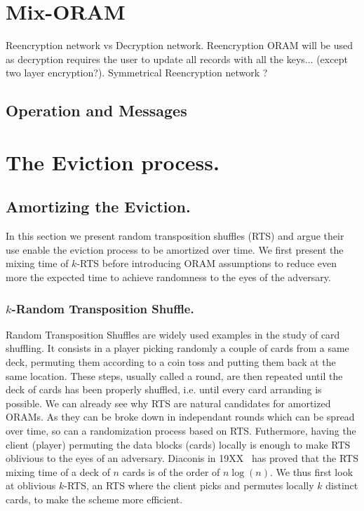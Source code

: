 \documentclass[a4paper]{article}
\begin{document}
\section{Mix-ORAM}
\label{section2}
Reencryption network vs Decryption network. Reencryption ORAM will be used as decryption requires the user to update all records with all the keys... (except two layer encryption?).
Symmetrical Reencryption network ?

\subsection{Operation and Messages}
\section{The Eviction process.}
\subsection{Amortizing the Eviction.}
In this section we present random transposition shuffles (RTS) and argue their use enable the eviction process to be amortized over time.
We first present the mixing time of $k$-RTS before introducing ORAM assumptions to reduce even more the expected time to achieve randomness to the eyes of the adversary.

\subsubsection{$k$-Random Transposition Shuffle.}
Random Transposition Shuffles are widely used examples in the study of card shuffling. It consists in a player picking randomly a couple of cards from a same deck, permuting them according to a coin toss and putting them back at the same location.
These steps, usually called a round, are then repeated until the deck of cards has been properly shuffled, i.e. until every card arranding is possible.
We can already see why RTS are natural candidates for amortized ORAMs. As they can be broke down in independant rounds which can be spread over time, so can a randomization process based on RTS. Futhermore, having the client (player) permuting the data blocks (cards) locally is enough to make RTS oblivious to the eyes of an adversary.
Diaconis in 19XX~\cite{} has proved that the RTS mixing time of a deck of $n$ cards is of the order of $n\log(n)$. We thus first look at oblivious $k$-RTS, an RTS where the client picks and permutes locally $k$ distinct cards, to make the scheme more efficient.
\end{document}
